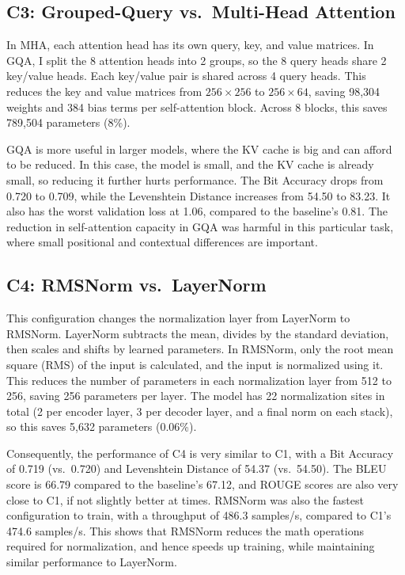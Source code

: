 \documentclass[12pt]{article}
\begin{document}
\subsection{C3: Grouped-Query vs.\ Multi-Head Attention}

In MHA, each attention head has its own query, key, and value matrices. In GQA,
I split the 8 attention heads into 2 groups, so the 8 query heads share 2
key/value heads. Each key/value pair is shared across 4 query heads. This
reduces the key and value matrices from $256 \times 256$ to $256 \times 64$,
saving 98,304 weights and 384 bias terms per self-attention block. Across 8
blocks, this saves 789,504 parameters (8\%).

GQA is more useful in larger models, where the KV cache is big and can afford to
be reduced. In this case, the model is small, and the KV cache is already small,
so reducing it further hurts performance. The Bit Accuracy drops from 0.720 to
0.709, while the Levenshtein Distance increases from 54.50 to 83.23. It also has
the worst validation loss at 1.06, compared to the baseline's 0.81. The
reduction in self-attention capacity in GQA was harmful in this particular task,
where small positional and contextual differences are important.

\subsection{C4: RMSNorm vs.\ LayerNorm}

This configuration changes the normalization layer from LayerNorm to RMSNorm.
LayerNorm subtracts the mean, divides by the standard deviation, then scales and
shifts by learned parameters. In RMSNorm, only the root mean square (RMS) of the
input is calculated, and the input is normalized using it. This reduces the
number of parameters in each normalization layer from 512 to 256, saving 256
parameters per layer. The model has 22 normalization sites in total (2 per
encoder layer, 3 per decoder layer, and a final norm on each stack), so this
saves 5,632 parameters (0.06\%).

Consequently, the performance of C4 is very similar to C1, with a Bit Accuracy
of 0.719 (vs.\ 0.720) and Levenshtein Distance of 54.37 (vs.\ 54.50). The BLEU
score is 66.79 compared to the baseline's 67.12, and ROUGE scores are also very
close to C1, if not slightly better at times. RMSNorm was also the fastest
configuration to train, with a throughput of 486.3 samples/s, compared to C1's
474.6 samples/s. This shows that RMSNorm reduces the math operations required
for normalization, and hence speeds up training, while maintaining similar
performance to LayerNorm.
\end{document}

